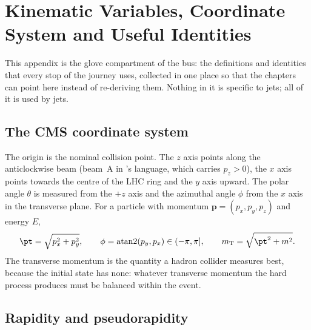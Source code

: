 \chapter{Kinematic Variables, Coordinate System and Useful Identities}
\label{app:kinematics}

This appendix is the glove compartment of the bus: the definitions and
identities that every stop of the journey uses, collected in one place so that
the chapters can point here instead of re-deriving them. Nothing in it is
specific to jets; all of it is used by jets.

\section{The CMS coordinate system}
\label{app:kinematics:coordinates}

The origin is the nominal collision point. The $z$ axis points along the
anticlockwise beam (beam~A in \PYTHIA's language, which carries $p_z>0$), the
$x$ axis points towards the centre of the LHC ring and the $y$ axis upward.
The polar angle $\theta$ is measured from the $+z$ axis and the azimuthal
angle $\phi$ from the $x$ axis in the transverse plane. For a particle with
momentum $\mathbf p=(p_x,p_y,p_z)$ and energy $E$,
\begin{equation}
  \pt=\sqrt{p_x^2+p_y^2},\qquad
  \phi=\operatorname{atan2}(p_y,p_x)\in(-\pi,\pi],\qquad
  m_{\mathrm T}=\sqrt{\pt^2+m^2}.
\end{equation}
The transverse momentum is the quantity a hadron collider measures best,
because the initial state has none: whatever transverse momentum the hard
process produces must be balanced within the event.

\section{Rapidity and pseudorapidity}
\label{app:kinematics:rapidity}

